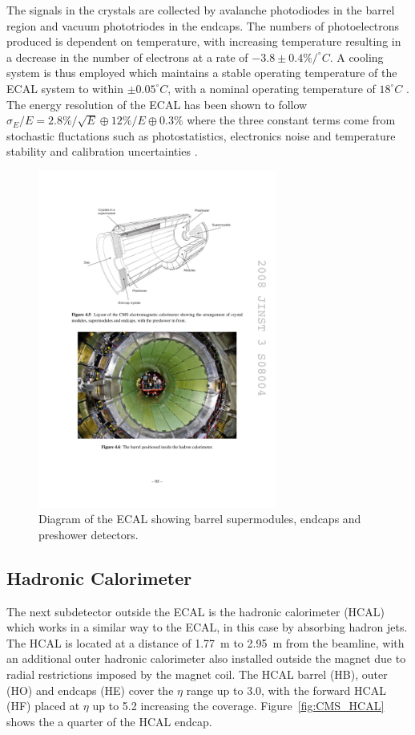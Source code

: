 The signals in the crystals are collected by avalanche photodiodes in the barrel region and vacuum
phototriodes in the endcaps. The numbers of photoelectrons produced is dependent on temperature, with
increasing temperature resulting in a decrease in the number of electrons at a rate of
$-3.8\pm0.4\%/^{\circ}C$. A cooling system is thus employed which maintains a stable operating temperature of
the ECAL system to within $\pm0.05^{\circ}C$, with a nominal operating temperature of $18^{\circ}C$
\cite{CMS_experiment}. The energy resolution of the ECAL has been shown to follow $\sigma_{E}/E =
2.8\%/\sqrt{E}\oplus 12\%/E \oplus 0.3\%$ where the three constant terms come from stochastic fluctations such
as photostatistics, electronics noise and temperature stability and calibration uncertainties
\cite{ECAL_calibration_and_resolution_at_7TeV}.

\begin{figure}[hbtp]
   \centering
     \includegraphics[width=0.7\textwidth]{Chapters/03_Detector/Images/ECAL.pdf}\hfill
     \caption{Diagram of the ECAL showing barrel supermodules, endcaps and preshower detectors.
     \cite{ECAL_calibration_and_resolution_at_7TeV}}
     \label{fig:CMS_ECAL}
\end{figure}

\subsection{Hadronic Calorimeter}
\label{ss:Hcal}
The next subdetector outside the ECAL is the hadronic calorimeter (HCAL) which works in a similar way to
the ECAL, in this case by absorbing hadron jets. The HCAL is located at a distance of 1.77~m to 2.95~m from
the beamline, with an additional outer hadronic calorimeter also installed outside the magnet due to
radial restrictions imposed by the magnet coil. The HCAL barrel (HB), outer (HO) and endcaps (HE) cover
the $\eta$ range up to 3.0, with the forward HCAL (HF) placed at $\eta$ up to 5.2 increasing the coverage.
Figure~\ref{fig:CMS_HCAL} shows the a quarter of the HCAL endcap.


